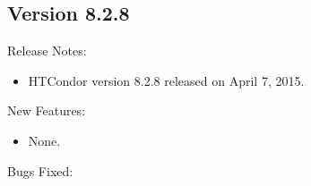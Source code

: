 \subsection*{\label{sec:New-8-2-8}Version 8.2.8}

\noindent Release Notes:

\begin{itemize}

\item HTCondor version 8.2.8 released on April 7, 2015.

\end{itemize}


\noindent New Features:

\begin{itemize}

\item None.

\end{itemize}

\noindent Bugs Fixed:

